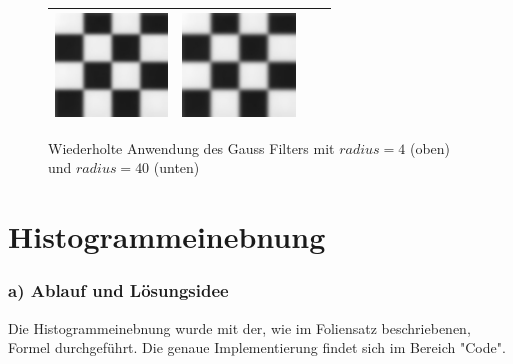 \documentclass[12pt,german]{article}
\begin{document}
\begin{figure} [H]
\begin{tabular}{| c | c | c | c |}
	\includegraphics[width=3cm]{../testData/Gauss/SchachbrettR40S4v3.jpg} & 	
	\includegraphics[width=3cm]{../testData/Gauss/SchachbrettR40S4v4.jpg} \\
	\hline
  \end{tabular}
  \caption{Wiederholte Anwendung des Gauss Filters mit $ radius = 4 $ (oben) und $radius = 40 $ (unten)}
  \label{tab:wiederholterGauss}


\end{figure}

\newpage
\section{Histogrammeinebnung  }

\subsubsection{a) Ablauf und Lösungsidee}
 Die Histogrammeinebnung wurde mit der, wie im Foliensatz beschriebenen, Formel durchgeführt. Die genaue Implementierung findet sich im Bereich "Code". 
\end{document}
